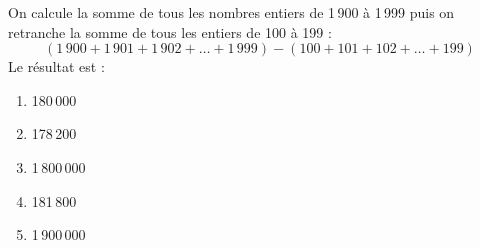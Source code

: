 On calcule la somme de tous les nombres entiers de 1\,900 à 1\,999 puis on retranche la somme de tous les entiers de 100 à 199 :
\[(1\,900+1\,901+1\,902+\ldots+1\,999)-(100+101+102+\ldots+199)\]
Le résultat est :
\begin{multicols}{5}
  \begin{enumerate}[A/]
  \item 180\,000
  \item 178\,200
  \item 1\,800\,000
  \item 181\,800
  \item 1\,900\,000
  \end{enumerate}
\end{multicols}